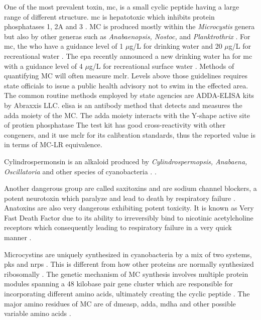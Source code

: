 One of the most prevalent toxin, \gls{mc}, is a small cyclic peptide having a large range of different structure. \gls{mc} is hepatotoxic which inhibits protein phosphatases 1, 2A and 3 \cite{moore_richard_cyanobacterial_1993}. MC is produced mostly within the \emph{Microcystis} genera but also by other generas such as \emph{Anabaenopsis,  Nostoc,} and \emph{Planktrothrix} \cite{rastogi_cyanotoxin-microcystins:_2014, davis_phylogenies_2014}. For \gls{mc}, the \gls{who} have a guidance level of 1 $\mu$g/L for drinking water and 20 $\mu$g/L for recreational water \cite{noauthor_guidelines_1998,noauthor_guidelines_2003}. The \gls{epa} recently announced a new drinking water \gls{ha} for \gls{mc} with a guidance level of 4 $\mu$g/L for recreational surface water \cite{usepa_draft_2016}. Methods of quantifying MC will often measure \gls{mclr}. Levels above those guidelines requires state officials to issue a public health advisory not to swim in the effected area.  The common routine methods employed by state agencies are ADDA-ELISA kits by Abraxxis LLC. \gls{elisa} is an antibody method that detects and measures the \gls{adda} moiety of the MC. The \gls{adda} moiety interacts with the Y-shape active site of protien phosphatase \cite{pereira_computational_2013} The test kit has good cross-reactivity with other congeners, and it use \gls{mclr} for its calibration standards, thus the reported value is in terms of MC-LR equivalence. 

Cylindrospermonsin is an alkaloid produced by \emph{Cylindrospermopsis, Anabaena, Oscillatoria} and other species of cyanobacteria \cite{dittmann_cyanobacterial_2012}.    \cite{usepa_draft_2016}.

Another dangerous group are called saxitoxins and are sodium channel blockers, a potent neurotoxin which paralyze and lead to death by respiratory failure \cite{moore_richard_cyanobacterial_1993}.  Anatoxins are also very dangerous exhibiting potent toxicity. It is known as Very Fast Death Factor due to its ability to irreversibly bind to nicotinic acetylcholine receptors which consequently leading to respiratory failure in a very quick manner \cite{codd_cyanobacterial_1999, moore_richard_cyanobacterial_1993}. 




Microcystins are uniquely synthesized in cyanobacteria by a mix of two systems, \gls{pks} and  \gls{nrps} \cite{tillett_structural_2000}. This is different from how other proteins are normally synthesized ribosomally . The genetic mechanism of MC synthesis involves multiple protein modules spanning a 48 kilobase pair gene cluster which are responsible for incorporating different amino acids, ultimately creating the cyclic peptide \cite{moffitt_characterization_2004,nishizawa_genetic_1999}. The major amino residues of MC  are of \gls{dmeasp}, \gls{adda},  \gls{mdha} and other possible variable amino acids \cite{trogen_conformational_1996,nishizawa_genetic_1999}.

